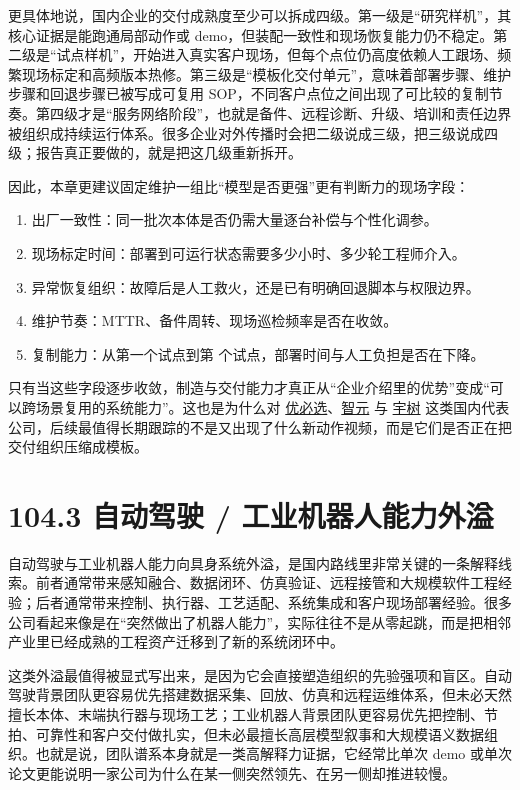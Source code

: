 更具体地说，国内企业的交付成熟度至少可以拆成四级。第一级是“研究样机”，其核心证据是能跑通局部动作或 demo，但装配一致性和现场恢复能力仍不稳定。第二级是“试点样机”，开始进入真实客户现场，但每个点位仍高度依赖人工跟场、频繁现场标定和高频版本热修。第三级是“模板化交付单元”，意味着部署步骤、维护步骤和回退步骤已被写成可复用 SOP，不同客户点位之间出现了可比较的复制节奏。第四级才是“服务网络阶段”，也就是备件、远程诊断、升级、培训和责任边界被组织成持续运行体系。很多企业对外传播时会把二级说成三级，把三级说成四级；报告真正要做的，就是把这几级重新拆开。

因此，本章更建议固定维护一组比“模型是否更强”更有判断力的现场字段：

\begin{enumerate}
\item 出厂一致性：同一批次本体是否仍需大量逐台补偿与个性化调参。
\item 现场标定时间：部署到可运行状态需要多少小时、多少轮工程师介入。
\item 异常恢复组织：故障后是人工救火，还是已有明确回退脚本与权限边界。
\item 维护节奏：MTTR、备件周转、现场巡检频率是否在收敛。
\item 复制能力：从第一个试点到第 \texttt{} 个试点，部署时间与人工负担是否在下降。
\end{enumerate}

只有当这些字段逐步收敛，制造与交付能力才真正从“企业介绍里的优势”变成“可以跨场景复用的系统能力”。这也是为什么对 \href{https://www.ubtrobot.com/}{优必选}、\href{https://www.agibot.com/}{智元} 与 \href{https://www.unitree.com/}{宇树} 这类国内代表公司，后续最值得长期跟踪的不是又出现了什么新动作视频，而是它们是否正在把交付组织压缩成模板。

\section*{104.3 自动驾驶 / 工业机器人能力外溢}


自动驾驶与工业机器人能力向具身系统外溢，是国内路线里非常关键的一条解释线索。前者通常带来感知融合、数据闭环、仿真验证、远程接管和大规模软件工程经验；后者通常带来控制、执行器、工艺适配、系统集成和客户现场部署经验。很多公司看起来像是在“突然做出了机器人能力”，实际往往不是从零起跳，而是把相邻产业里已经成熟的工程资产迁移到了新的系统闭环中。

这类外溢最值得被显式写出来，是因为它会直接塑造组织的先验强项和盲区。自动驾驶背景团队更容易优先搭建数据采集、回放、仿真和远程运维体系，但未必天然擅长本体、末端执行器与现场工艺；工业机器人背景团队更容易优先把控制、节拍、可靠性和客户交付做扎实，但未必最擅长高层模型叙事和大规模语义数据组织。也就是说，团队谱系本身就是一类高解释力证据，它经常比单次 demo 或单次论文更能说明一家公司为什么在某一侧突然领先、在另一侧却推进较慢。

